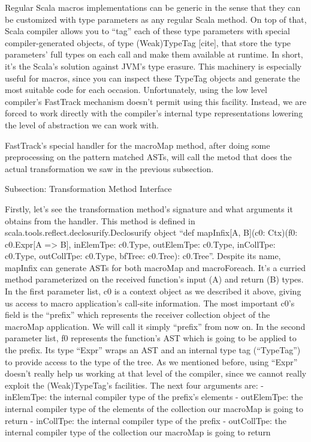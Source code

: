 Regular Scala macros implementations can be generic in the sense that they can
be customized with type parameters as any regular Scala method. On top of that,
Scala compiler allows you to ``tag'' each of these type parameters with special
compiler-generated objects, of type (Weak)TypeTag [cite], that store the type
parameters' full types on each call and make them available at runtime. In
short, it's the Scala's solution against JVM's type erasure. This machinery is
especially useful for macros, since you can inspect these TypeTag objects and
generate the most suitable code for each occasion. Unfortunately, using the low
level compiler's FastTrack mechanism doesn't permit using this facility.
Instead, we are forced to work directly with the compiler's internal type
representations lowering the level of abstraction we can work with.

FastTrack's special handler for the macroMap method, after
doing some preprocessing on the pattern matched ASTs, will call the metod
that does the actual transformation we saw in the previous subsection. 


Subsection: Transformation Method Interface

Firstly, let's see the transformation method's signature and what arguments it
obtains from the handler. This method is defined in
scala.tools.reflect.declosurify.Declosurify object ``def mapInfix[A, B](c0:
Ctx)(f0: c0.Expr[A => B], inElemTpe: c0.Type, outElemTpe: c0.Type, inCollTpe:
c0.Type, outCollTpe: c0.Type, bfTree: c0.Tree): c0.Tree''. Despite its name,
mapInfix can generate ASTs for both macroMap and macroForeach. It's a curried
method parameterized on the received function's input (A) and return (B) types.
In the first parameter list, c0 is a context object as we described it above,
giving us access to macro application's call-site information. The most
important c0's field is the ``prefix'' which represents the receiver collection
object of the macroMap application. We will call it simply ``prefix''
from now on. In the second parameter
list, f0 represents the function's AST which is going to be applied to the
prefix. Its type ``Expr'' wraps an AST and an internal type tag
(``TypeTag'') to provide access to the type of the tree. As we mentioned
before, using ``Expr'' doesn't really help us working at that level of the
compiler, since we cannot really exploit the (Weak)TypeTag's facilities. The
next four arguments are:
 - inElemTpe: the internal compiler type of the prefix's elements
 - outElemTpe: the internal compiler type of the elements of the collection our
macroMap
is going to return
- inCollTpe: the internal compiler type of the prefix
- outCollTpe: the internal compiler type of the collection our macroMap is going
to return

